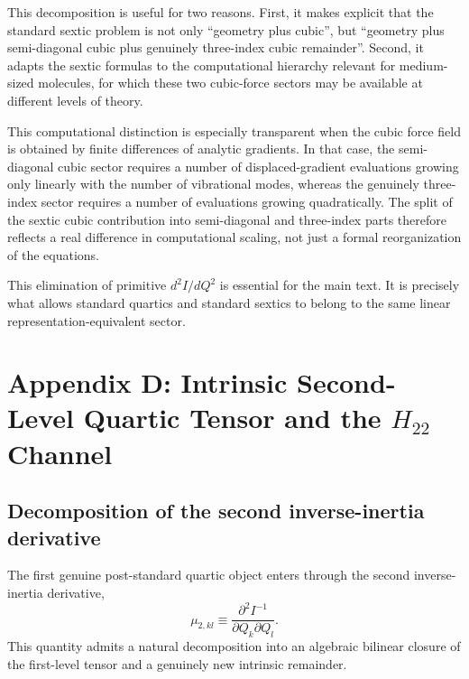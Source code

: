 \documentclass[aip,jcp,reprint,floatfix]{revtex4-2}
\begin{document}
This decomposition is useful for two reasons. First, it makes explicit that
the standard sextic problem is not only ``geometry plus cubic'', but
``geometry plus semi-diagonal cubic plus genuinely three-index cubic
remainder''. Second, it adapts the sextic formulas to the computational
hierarchy relevant for medium-sized molecules, for which these two cubic-force
sectors may be available at different levels of theory.

This computational distinction is especially transparent when the cubic force
field is obtained by finite differences of analytic gradients. In that case,
the semi-diagonal cubic sector requires a number of displaced-gradient
evaluations growing only linearly with the number of vibrational modes,
whereas the genuinely three-index sector requires a number of evaluations
growing quadratically. The split of the sextic cubic contribution into
semi-diagonal and three-index parts therefore reflects a real difference in
computational scaling, not just a formal reorganization of the equations.\cite{cubic-vib_2024,fast_dvib_2025}

This elimination of primitive $d^2I/dQ^2$ is essential for the main text. It
is precisely what allows standard quartics and standard sextics to belong to
the same linear representation-equivalent sector.

\section{Appendix D: Intrinsic Second-Level Quartic Tensor and the \texorpdfstring{$H_{22}$}{H22} Channel}

\subsection{Decomposition of the second inverse-inertia derivative}

The first genuine post-standard quartic object enters through the second
inverse-inertia derivative,
\begin{equation}
\mu_{2,kl} \equiv \frac{\partial^2 I^{-1}}{\partial Q_k \partial Q_l}.
\end{equation}
This quantity admits a natural decomposition into an algebraic bilinear closure
of the first-level tensor and a genuinely new intrinsic remainder.
\end{document}
